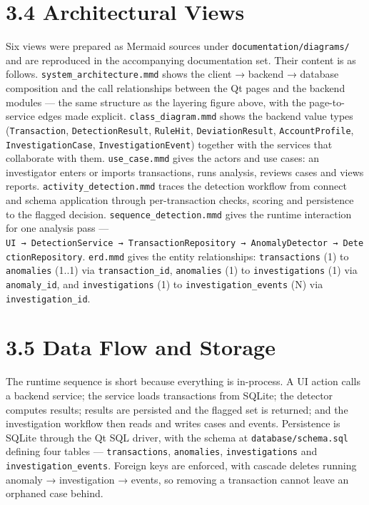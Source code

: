 \documentclass[
  12pt,
]{report}
\begin{document}
\section{3.4 Architectural Views}\label{architectural-views}

Six views were prepared as Mermaid sources under
\texttt{documentation/\allowbreak{}diagrams/\allowbreak{}} and are reproduced in the accompanying
documentation set. Their content is as follows.
\texttt{system\_architecture.mmd} shows the client → backend → database
composition and the call relationships between the Qt pages and the
backend modules --- the same structure as the layering figure above,
with the page-to-service edges made explicit.
\texttt{class\_diagram.mmd} shows the backend value types
(\texttt{Transaction}, \texttt{DetectionResult}, \texttt{RuleHit},
\texttt{DeviationResult}, \texttt{AccountProfile},
\texttt{Investigation\-Case}, \texttt{Investigation\-Event}) together with
the services that collaborate with them. \texttt{use\_case.mmd} gives
the actors and use cases: an investigator enters or imports
transactions, runs analysis, reviews cases and views reports.
\texttt{activity\_detection.mmd} traces the detection workflow from
connect and schema application through per-transaction checks, scoring
and persistence to the flagged decision.
\texttt{sequence\_detection.mmd} gives the runtime interaction for one
analysis pass ---
\texttt{UI\ →\ Detection\-Service\ →\ Transaction\-Repository\ →\ AnomalyDetector\ →\ Detection\-Repository}.
\texttt{erd.mmd} gives the entity relationships: \texttt{transactions}
(1) to \texttt{anomalies} (1..1) via \texttt{transaction\_id},
\texttt{anomalies} (1) to \texttt{investigations} (1) via
\texttt{anomaly\_id}, and \texttt{investigations} (1) to
\texttt{investigation\_events} (N) via \texttt{investigation\_id}.

\section{3.5 Data Flow and Storage}\label{data-flow-and-storage}

The runtime sequence is short because everything is in-process. A UI
action calls a backend service; the service loads transactions from
SQLite; the detector computes results; results are persisted and the
flagged set is returned; and the investigation workflow then reads and
writes cases and events. Persistence is SQLite through the Qt SQL
driver, with the schema at \texttt{database/\allowbreak{}schema.sql} defining four
tables --- \texttt{transactions}, \texttt{anomalies},
\texttt{investigations} and \texttt{investigation\_events}. Foreign keys
are enforced, with cascade deletes running anomaly → investigation →
events, so removing a transaction cannot leave an orphaned case behind.
\end{document}
